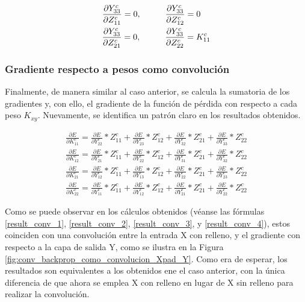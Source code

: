\begin{gather}
	\frac{\partial Y^c_{33}}{\partial Z^c_{11}} = 0, \hspace{10mm} \frac{\partial Y^c_{33}}{\partial Z^c_{12}} = 0 \hspace{4mm} \label{gradr_Y33_z_1} \\
	\frac{\partial Y^c_{33}}{\partial Z^c_{21}} = 0, \hspace{10mm} \frac{\partial Y^c_{33}}{\partial Z^c_{22}} = K^c_{11} \label{gradr_Y33_z_2}
\end{gather}


\subsubsection{Gradiente respecto a pesos como convolución}

Finalmente, de manera similar al caso anterior, se calcula la sumatoria de los gradientes y, con ello, el gradiente de la función de pérdida con respecto a cada peso $K_{xy}$. Nuevamente, se identifica un patrón claro en los resultados obtenidos.

\begin{gather}
	\frac{\partial E}{\partial K^c_{11}} = \frac{\partial E}{\partial Y^c_{22}} * Z^c_{11} + \frac{\partial E}{\partial Y^c_{23}} * Z^c_{12} + \frac{\partial E}{\partial Y^c_{32}} * Z^c_{21} + \frac{\partial E}{\partial Y^c_{33}} * Z^c_{22} \label{result_conv_1} \\
	\frac{\partial E}{\partial K^c_{12}} = \frac{\partial E}{\partial Y^c_{21}} * Z^c_{11} + \frac{\partial E}{\partial Y^c_{22}} * Z^c_{12} + \frac{\partial E}{\partial Y^c_{31}} * Z^c_{21} + \frac{\partial E}{\partial Y^c_{32}} * Z^c_{22} \label{result_conv_2} \\
	\frac{\partial E}{\partial K^c_{21}} = \frac{\partial E}{\partial Y^c_{12}} * Z^c_{11} + \frac{\partial E}{\partial Y^c_{13}} * Z^c_{12} + \frac{\partial E}{\partial Y^c_{22}} * Z^c_{21} + \frac{\partial E}{\partial Y^c_{23}} * Z^c_{22} \label{result_conv_3} \\
	\frac{\partial E}{\partial K^c_{22}} = \frac{\partial E}{\partial Y^c_{11}} * Z^c_{11} + \frac{\partial E}{\partial Y^c_{12}} * Z^c_{12} + \frac{\partial E}{\partial Y^c_{21}} * Z^c_{21} + \frac{\partial E}{\partial Y^c_{22}} * Z^c_{22} \label{result_conv_4}
\end{gather}

Como se puede observar en los cálculos obtenidos (véanse las fórmulas \ref{result_conv_1}, \ref{result_conv_2}, \ref{result_conv_3}, y \ref{result_conv_4}), estos coinciden con una convolución entre la entrada X con relleno, y el gradiente con respecto a la capa de salida Y, como se ilustra en la Figura \ref{fig:conv_backprop_como_convolucion_Xpad_Y}. Como era de esperar, los resultados son equivalentes a los obtenidos ene el caso anterior, con la única diferencia de que ahora se emplea X con relleno en lugar de X sin relleno para realizar la convolución.

